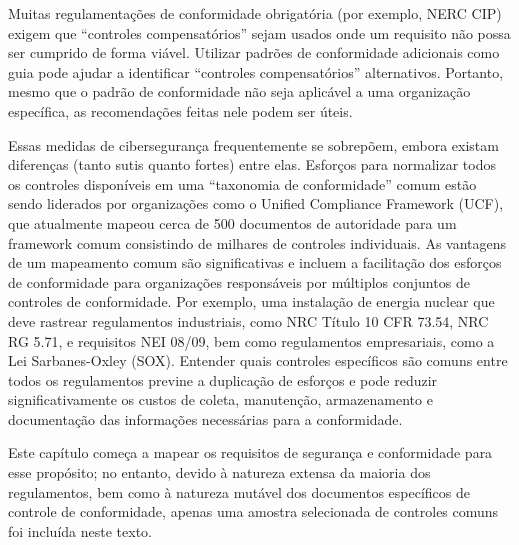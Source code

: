 Muitas regulamentações de conformidade obrigatória (por exemplo, NERC CIP) exigem que ``controles compensatórios'' sejam usados onde um requisito não possa ser cumprido de forma viável. Utilizar padrões de conformidade adicionais como guia pode ajudar a identificar ``controles compensatórios'' alternativos. Portanto, mesmo que o padrão de conformidade não seja aplicável a uma organização específica, as recomendações feitas nele podem ser úteis.

Essas medidas de cibersegurança frequentemente se sobrepõem, embora existam diferenças (tanto sutis quanto fortes) entre elas. Esforços para normalizar todos os controles disponíveis em uma ``taxonomia de conformidade'' comum estão sendo liderados por organizações como o Unified Compliance Framework (UCF), que atualmente mapeou cerca de 500 documentos de autoridade para um framework comum consistindo de milhares de controles individuais. As vantagens de um mapeamento comum são significativas e incluem a facilitação dos esforços de conformidade para organizações responsáveis por múltiplos conjuntos de controles de conformidade. Por exemplo, uma instalação de energia nuclear que deve rastrear regulamentos industriais, como NRC Título 10 CFR 73.54, NRC RG 5.71, e requisitos NEI 08/09, bem como regulamentos empresariais, como a Lei Sarbanes-Oxley (SOX). Entender quais controles específicos são comuns entre todos os regulamentos previne a duplicação de esforços e pode reduzir significativamente os custos de coleta, manutenção, armazenamento e documentação das informações necessárias para a conformidade.

Este capítulo começa a mapear os requisitos de segurança e conformidade para esse propósito; no entanto, devido à natureza extensa da maioria dos regulamentos, bem como à natureza mutável dos documentos específicos de controle de conformidade, apenas uma amostra selecionada de controles comuns foi incluída neste texto.



